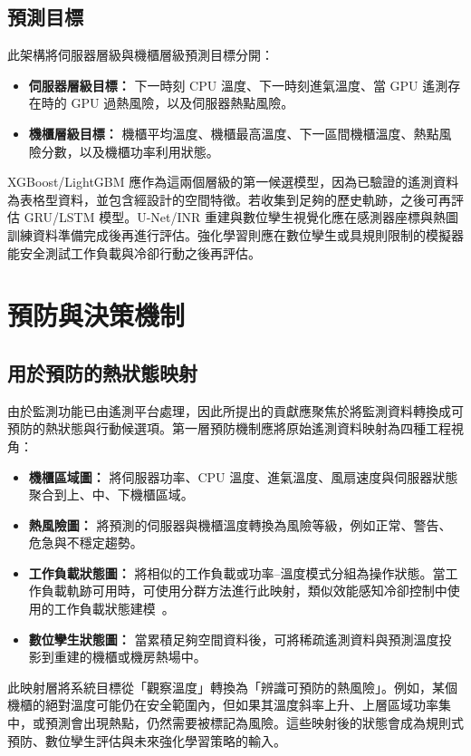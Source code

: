 \documentclass[12pt,a4paper]{article}
\begin{document}
\FloatBarrier

\subsection{預測目標}

此架構將伺服器層級與機櫃層級預測目標分開：
\begin{itemize}
\item \textbf{伺服器層級目標：} 下一時刻 CPU 溫度、下一時刻進氣溫度、當 GPU 遙測存在時的 GPU 過熱風險，以及伺服器熱點風險。
\item \textbf{機櫃層級目標：} 機櫃平均溫度、機櫃最高溫度、下一區間機櫃溫度、熱點風險分數，以及機櫃功率利用狀態。
\end{itemize}

XGBoost/LightGBM 應作為這兩個層級的第一候選模型，因為已驗證的遙測資料為表格型資料，並包含經設計的空間特徵。若收集到足夠的歷史軌跡，之後可再評估 GRU/LSTM 模型。U-Net/INR 重建與數位孿生視覺化應在感測器座標與熱圖訓練資料準備完成後再進行評估。強化學習則應在數位孿生或具規則限制的模擬器能安全測試工作負載與冷卻行動之後再評估。

\section{預防與決策機制}

\subsection{用於預防的熱狀態映射}

由於監測功能已由遙測平台處理，因此所提出的貢獻應聚焦於將監測資料轉換成可預防的熱狀態與行動候選項。第一層預防機制應將原始遙測資料映射為四種工程視角：
\begin{itemize}
\item \textbf{機櫃區域圖：} 將伺服器功率、CPU 溫度、進氣溫度、風扇速度與伺服器狀態聚合到上、中、下機櫃區域。
\item \textbf{熱風險圖：} 將預測的伺服器與機櫃溫度轉換為風險等級，例如正常、警告、危急與不穩定趨勢。
\item \textbf{工作負載狀態圖：} 將相似的工作負載或功率--溫度模式分組為操作狀態。當工作負載軌跡可用時，可使用分群方法進行此映射，類似效能感知冷卻控制中使用的工作負載狀態建模~\cite{chan_2019}。
\item \textbf{數位孿生狀態圖：} 當累積足夠空間資料後，可將稀疏遙測資料與預測溫度投影到重建的機櫃或機房熱場中。
\end{itemize}

此映射層將系統目標從「觀察溫度」轉換為「辨識可預防的熱風險」。例如，某個機櫃的絕對溫度可能仍在安全範圍內，但如果其溫度斜率上升、上層區域功率集中，或預測會出現熱點，仍然需要被標記為風險。這些映射後的狀態會成為規則式預防、數位孿生評估與未來強化學習策略的輸入。
\end{document}

